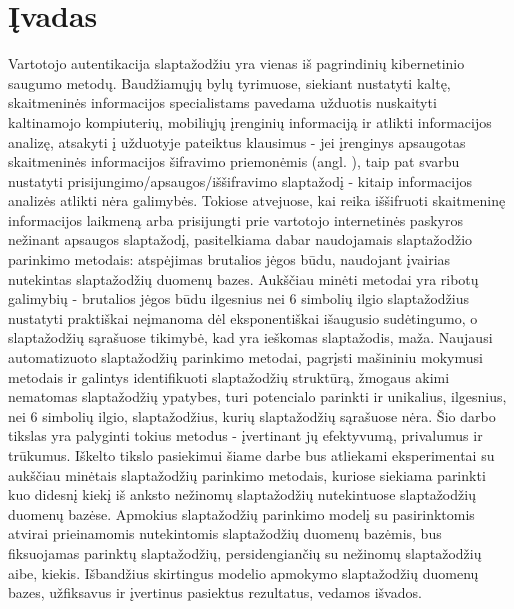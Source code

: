 \documentclass{VUMIFInfBakalaurinis}
\begin{document}
\section{Įvadas}
Vartotojo autentikacija slaptažodžiu yra vienas iš pagrindinių kibernetinio 
saugumo metodų.
Baudžiamųjų bylų tyrimuose, siekiant nustatyti kaltę, skaitmeninės informacijos 
specialistams pavedama užduotis nuskaityti kaltinamojo kompiuterių, mobiliųjų 
įrenginių informaciją ir atlikti informacijos analizę, atsakyti į užduotyje 
pateiktus klausimus - jei įrenginys apsaugotas skaitmeninės informacijos 
šifravimo priemonėmis (angl. ), taip pat svarbu 
nustatyti prisijungimo/apsaugos/iššifravimo slaptažodį - kitaip informacijos 
analizės atlikti nėra galimybės.
Tokiose atvejuose, kai reika iššifruoti skaitmeninę informacijos laikmeną arba 
prisijungti prie vartotojo internetinės paskyros nežinant apsaugos slaptažodį, 
pasitelkiama dabar naudojamais slaptažodžio parinkimo metodais: atspėjimas 
brutalios jėgos būdu, naudojant įvairias nutekintas slaptažodžių duomenų bazes. 
Aukščiau minėti metodai yra ribotų galimybių - brutalios jėgos būdu ilgesnius 
nei 6 simbolių ilgio slaptažodžius nustatyti praktiškai neįmanoma dėl 
eksponentiškai išaugusio sudėtingumo, o slaptažodžių sąrašuose tikimybė, kad yra 
ieškomas slaptažodis, maža.
Naujausi automatizuoto slaptažodžių parinkimo metodai, pagrįsti mašininiu 
mokymusi metodais ir galintys identifikuoti slaptažodžių struktūrą, žmogaus 
akimi nematomas slaptažodžių ypatybes, turi potencialo parinkti ir unikalius, 
ilgesnius, nei 6 simbolių ilgio, slaptažodžius, kurių slaptažodžių sąrašuose 
nėra. Šio darbo tikslas yra palyginti tokius metodus - įvertinant jų efektyvumą, 
privalumus ir trūkumus.
Iškelto tikslo pasiekimui šiame darbe bus atliekami eksperimentai su aukščiau 
minėtais slaptažodžių parinkimo metodais, kuriose siekiama parinkti kuo didesnį 
kiekį iš anksto nežinomų slaptažodžių nutekintuose slaptažodžių duomenų bazėse. 
Apmokius slaptažodžių parinkimo modelį su pasirinktomis atvirai prieinamomis 
nutekintomis slaptažodžių duomenų bazėmis, bus fiksuojamas parinktų 
slaptažodžių, persidengiančių su nežinomų slaptažodžių aibe, kiekis. Išbandžius 
skirtingus modelio apmokymo slaptažodžių duomenų bazes, užfiksavus ir įvertinus 
pasiektus rezultatus, vedamos išvados.
\end{document}

